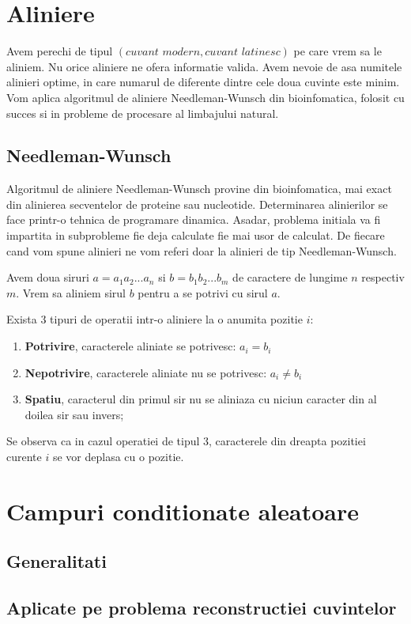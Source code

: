 \section{Aliniere}
Avem perechi de tipul $(\textit{cuvant modern}, \textit{cuvant latinesc})$ pe care vrem sa le aliniem.
Nu orice aliniere ne ofera informatie valida. Avem nevoie de asa numitele alinieri optime, in care
numarul de diferente dintre cele doua cuvinte este minim. Vom aplica algoritmul de aliniere 
Needleman-Wunsch\cite{needle} din bioinfomatica, folosit cu succes si in probleme de procesare al
limbajului natural. 

\subsection{Needleman-Wunsch}
Algoritmul de aliniere Needleman-Wunsch provine din bioinfomatica, mai exact din alinierea secventelor
de proteine sau nucleotide. Determinarea alinierilor se face printr-o tehnica
de programare dinamica. Asadar, problema initiala va fi impartita in subprobleme fie deja calculate
fie mai usor de calculat. De fiecare cand vom spune alinieri ne vom referi doar la alinieri de tip
Needleman-Wunsch.

Avem doua siruri $a=a_1a_2...a_n$ si $b=b_1b_2...b_m$ de caractere de lungime $n$ respectiv $m$. 
Vrem sa aliniem sirul $b$ pentru a se potrivi cu sirul $a$.  

Exista 3 tipuri de operatii intr-o aliniere la o anumita pozitie $i$:
\begin{enumerate}
  \item \textbf{Potrivire}, caracterele aliniate se potrivesc: $a_i=b_i$
  \item \textbf{Nepotrivire}, caracterele aliniate nu se potrivesc: $a_i \neq b_i$
  \item \textbf{Spatiu}, caracterul din primul sir nu se aliniaza cu niciun caracter din al doilea sir
    sau invers;
\end{enumerate}

Se observa ca in cazul operatiei de tipul 3, caracterele din dreapta pozitiei curente $i$ se vor
deplasa cu o pozitie.

\section{Campuri conditionate aleatoare}
\subsection{Generalitati}
\subsection{Aplicate pe problema reconstructiei cuvintelor}

